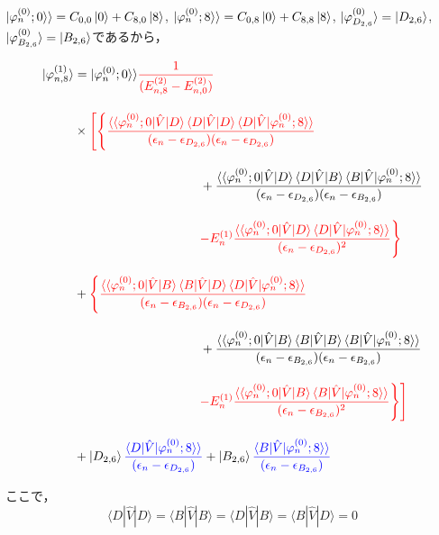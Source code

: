 $|\varphi^{(0)}_{n};0\rangle\rangle=C_{0,0}\ket{0}+C_{8,0}\ket{8}$, 
$|\varphi^{(0)}_{n};8\rangle\rangle=C_{0,8}\ket{0}+C_{8,8}\ket{8}$,  $|\varphi^{(0)}_{D_{2,6}}\rangle=\ket{D_{2,6}}$, $|\varphi^{(0)}_{B_{2,6}}\rangle=\ket{B_{2,6}}$であるから，


\begin{align}
    \ket{\varphi_{n,8}^{(1)}}
    &=
    |\varphi^{(0)}_n;0\rangle\rangle
    \textcolor{red}{\frac{1}{(E^{(2)}_{n,8}-E^{(2)}_{n,0})}}\nn[10pt]
    &\times
    \textcolor{red}{\Biggl[\Biggl\{
    \frac{\langle\braket{\varphi^{(0)}_{n};0|\hat{V}|D}
    \langle{D|\hat{V}|D}\rangle
    \braket{D|\hat{V}|\varphi^{(0)}_n;8}\rangle}
    {(\epsilon_n-\epsilon_{D_{2,6}})(\epsilon_n-\epsilon_{D_{2,6}})}}\nn[10pt]
    &\hspace{100pt}
    +{\frac{\langle\braket{\varphi^{(0)}_{n};0|\hat{V}|D}
    \langle{D|\hat{V}|B}\rangle
    \braket{B|\hat{V}|\varphi^{(0)}_n;8}\rangle}
    {(\epsilon_n-\epsilon_{D_{2,6}})(\epsilon_n-\epsilon_{B_{2,6}})}}\nn[10pt]
    &\hspace{100pt}
    \textcolor{red}{-E^{(1)}_n
    \frac{\langle\braket{\varphi^{(0)}_{n};0|\hat{V}|D}
    \braket{D|\hat{V}|\varphi^{(0)}_n;8}\rangle}{(\epsilon_n-\epsilon_{D_{2,6}})^2}
    \Biggr\}}
    \nn[10pt]
    &+\textcolor{red}{\Biggl\{
    \frac{\langle\braket{\varphi^{(0)}_{n};0|\hat{V}|B}
    \langle{B|\hat{V}|D}\rangle
    \braket{D|\hat{V}|\varphi^{(0)}_n;8}\rangle}
    {(\epsilon_n-\epsilon_{B_{2,6}})(\epsilon_n-\epsilon_{D_{2,6}})}}\nn[10pt]
    &\hspace{100pt}
    +{\frac{\langle\braket{\varphi^{(0)}_{n};0|\hat{V}|B}
    \langle{B|\hat{V}|B}\rangle
    \braket{B|\hat{V}|\varphi^{(0)}_n;8}\rangle}
    {(\epsilon_n-\epsilon_{B_{2,6}})(\epsilon_n-\epsilon_{B_{2,6}})}}\nn[10pt]
    &\hspace{100pt}
    \textcolor{red}{-E^{(1)}_n
    \frac{\langle\braket{\varphi^{(0)}_{n};0|\hat{V}|B}
    \braket{B|\hat{V}|\varphi^{(0)}_n;8}\rangle}{(\epsilon_n-\epsilon_{B_{2,6}})^2}
    \Biggr\}\Biggr]}
    \nn[10pt]
    &+
    \ket{D_{2,6}}
    \textcolor{blue}{
    \frac{\braket{D|\hat{V}|\varphi^{(0)}_n;8}\rangle}{(\epsilon_n-\epsilon_{D_{2,6}})}}
    +
    \ket{B_{2,6}}
    \textcolor{blue}{
    \frac{\braket{B|\hat{V}|\varphi^{(0)}_n;8}\rangle}{(\epsilon_n-\epsilon_{B_{2,6}})}}
\end{align}

ここで，
\begin{equation}
    \langle{D|\hat{V}|D}\rangle
    =\langle{B|\hat{V}|B}\rangle
    =\langle{D|\hat{V}|B}\rangle
    =\langle{B|\hat{V}|D}\rangle=0
\end{equation}

